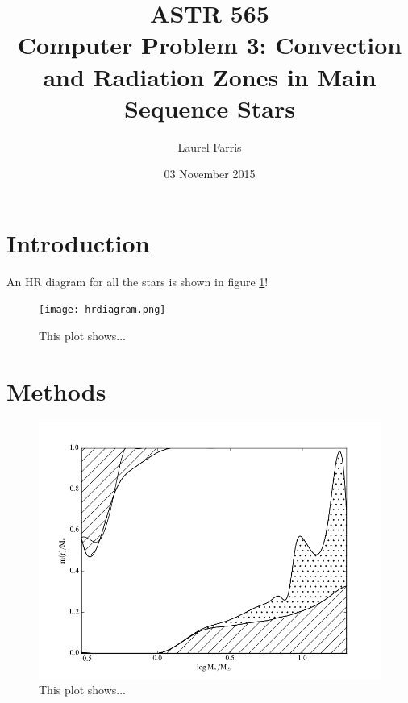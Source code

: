 \documentclass[12pt]{article}
\title{ASTR 565 \\
Computer Problem 3: Convection and Radiation Zones in Main Sequence
Stars}
\author{Laurel Farris}
\date{03 November 2015}
\begin{document}
\maketitle

\section{Introduction}


An HR diagram for all the stars is shown in figure \ref{hrdiagram}!

\begin{figure}%
  \centering
  \texttt{[image: hrdiagram.png]}
  \caption{This plot shows...}
  \label{hrdiagram}
\end{figure}


\section{Methods}

\begin{figure}%
  \centering
  \includegraphics[width=7.0in]{money.png}
  \caption{This plot shows...}
  \label{money}
\end{figure}
\end{document}
